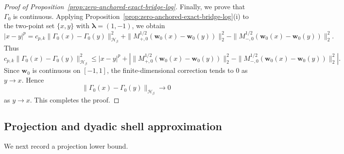 \documentclass[11pt]{article}
\theoremstyle{definition}
\begin{document}
\begin{proof}[Proof of Proposition~\ref{prop:zero-anchored-exact-bridge-log}]
Finally, we prove that \(\Gamma_0\) is continuous.  Applying
Proposition~\ref{prop:zero-anchored-exact-bridge-log}\textnormal{(i)} to the
two-point set \(\{x,y\}\) with \(\boldsymbol\lambda=(1,-1)\), we obtain
\[
|x-y|^p
=
c_{p,k}\|\Gamma_0(x)-\Gamma_0(y)\|_{\mathcal H_\beta}^2
+
\|M_{+,0}^{1/2}(\boldsymbol w_0(x)-\boldsymbol w_0(y))\|_2^2
-
\|M_{-,0}^{1/2}(\boldsymbol w_0(x)-\boldsymbol w_0(y))\|_2^2.
\]
Thus
\[
c_{p,k}\|\Gamma_0(x)-\Gamma_0(y)\|_{\mathcal H_\beta}^2
\le
|x-y|^p
+
\left|
\|M_{+,0}^{1/2}(\boldsymbol w_0(x)-\boldsymbol w_0(y))\|_2^2
-
\|M_{-,0}^{1/2}(\boldsymbol w_0(x)-\boldsymbol w_0(y))\|_2^2
\right|.
\]
Since \(\boldsymbol w_0\) is continuous on \([-1,1]\), the finite-dimensional correction tends
to \(0\) as \(y\to x\).  Hence
\[
\|\Gamma_0(x)-\Gamma_0(y)\|_{\mathcal H_\beta}\to0
\]
as \(y\to x\).  This completes the proof.



\end{proof}
\subsection{Projection and dyadic shell approximation}

We next record a projection lower bound.
\end{document}
